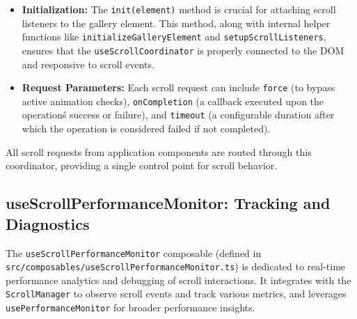 \documentclass[10pt]{article}
\begin{document}
\begin{itemize}
    \item \textbf{Initialization:} The \texttt{init(element)} method is crucial for attaching scroll listeners to the gallery element. This method, along with internal helper functions like \texttt{initializeGalleryElement} and \texttt{setupScrollListeners}, ensures that the \texttt{useScrollCoordinator} is properly connected to the DOM and responsive to scroll events.
    \item \textbf{Request Parameters:} Each scroll request can include \texttt{force} (to bypass active animation checks), \texttt{onCompletion} (a callback executed upon the operation\'s success or failure), and \texttt{timeout} (a configurable duration after which the operation is considered failed if not completed).
\end{itemize}
All scroll requests from application components are routed through this coordinator, providing a single control point for scroll behavior.

\subsection{useScrollPerformanceMonitor: Tracking and Diagnostics}

The \texttt{useScrollPerformanceMonitor} composable (defined in \linebreak[4] 
\texttt{src/composables/useScrollPerformanceMonitor.ts}) is dedicated to 
real-time performance analytics and debugging of scroll interactions. It integrates 
with the \texttt{ScrollManager} to observe scroll events and track various metrics, 
and leverages \texttt{usePerformanceMonitor} for broader performance insights.
\end{document}
